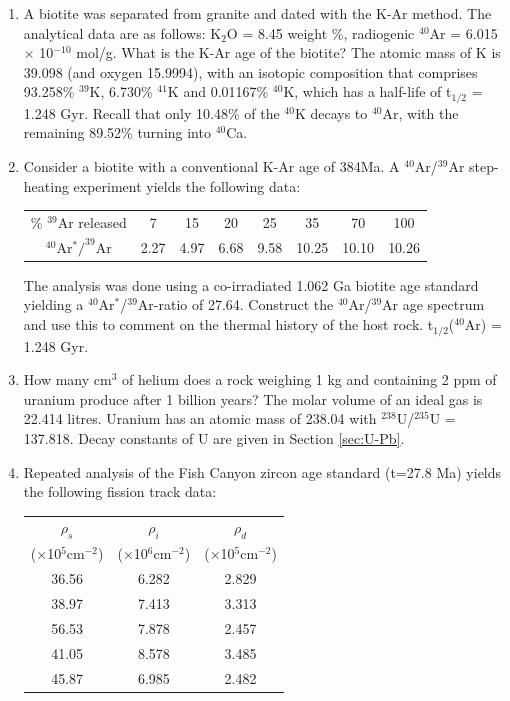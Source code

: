 \begin{enumerate}
\item A biotite was separated from granite and dated with the K-Ar
  method. The analytical data are as follows: K$_2$O = 8.45 weight \%,
  radiogenic $^{40}$Ar = 6.015 $\times$ 10$^{-10}$ mol/g.  What is the
  K-Ar age of the biotite? The atomic mass of K is 39.098 (and oxygen
  15.9994), with an isotopic composition that comprises 93.258\%
  $^{39}$K, 6.730\% $^{41}$K and 0.01167\% $^{40}$K, which has a
  half-life of t$_{1/2}$ = 1.248 Gyr. Recall that only 10.48\% of the
  $^{40}$K decays to $^{40}$Ar, with the remaining 89.52\% turning
  into $^{40}$Ca. 

\item Consider a biotite with a conventional K-Ar age of 384Ma. A
  $^{40}$Ar/$^{39}$Ar step-heating experiment yields the following
  data:

\begin{centering}
\begin{tabular}{c@{~}|@{~}c@{~}c@{~}c@{~}c@{~}c@{~}c@{~}c}
\% $^{39}$Ar released & 7 & 15 & 20 & 25 & 35 & 70 & 100\\
$^{40}$Ar$^*/^{39}$Ar & 2.27 & 4.97 & 6.68 & 9.58 & 10.25 & 10.10 & 10.26 \\
\end{tabular}
\end{centering}

The analysis was done using a co-irradiated 1.062 Ga biotite age
standard yielding a $^{40}$Ar$^*$/$^{39}$Ar-ratio of 27.64.  Construct
the $^{40}$Ar/$^{39}$Ar age spectrum and use this to comment on the
thermal history of the host rock. t$_{1/2}$($^{40}$Ar) = 1.248
Gyr.\\ 

\item How many cm$^3$ of helium does a rock weighing 1 kg and
  containing 2 ppm of uranium produce after 1 billion years? The molar
  volume of an ideal gas is 22.414 litres. Uranium has an atomic mass
  of 238.04 with $^{238}$U/$^{235}$U = 137.818. Decay constants of U
  are given in Section \ref{sec:U-Pb}.

\item Repeated analysis of the Fish Canyon zircon age standard (t=27.8
  Ma) yields the following fission track data:
  
\begin{centering}
\begin{tabular}{ccc}
$\rho_s$ & $\rho_i$ & $\rho_d$ \\
($\times$10$^5$cm$^{-2}$) & ($\times$10$^6$cm$^{-2}$) & ($\times$10$^5$cm$^{-2}$)\\
\hline
36.56 & 6.282 & 2.829 \\
38.97 & 7.413 & 3.313 \\
56.53 & 7.878 & 2.457 \\
41.05 & 8.578 & 3.485 \\
45.87 & 6.985 & 2.482
\end{tabular}
\end{centering}


\end{enumerate}
